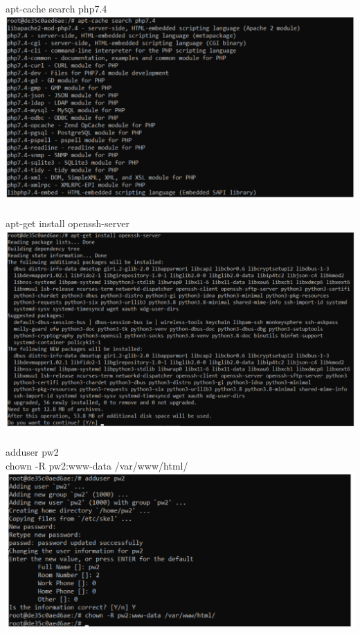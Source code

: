 \documentclass{article}
\begin{document}
\\
\\
apt-cache search php7.4\\
\includegraphics[width=\textwidth]{img/c4.png}
\\
\\
apt-get install openssh-server\\
\includegraphics[width=\textwidth]{img/c5.png}
\\
\\
adduser pw2\\
chown -R pw2:www-data /var/www/html/\\
\includegraphics[width=\textwidth]{img/c6.png}
\end{document}
